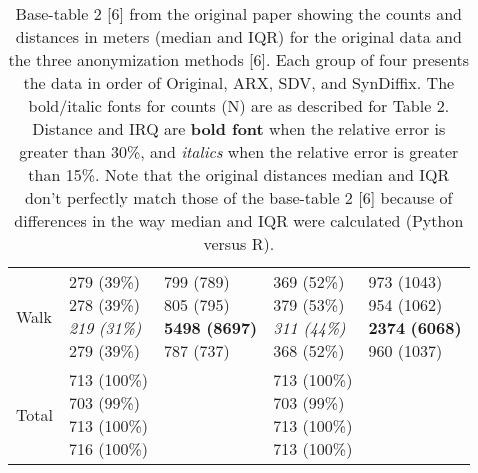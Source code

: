\documentclass[10pt]{article}
\newcommand{\mycite}[1]{[#1]}
\begin{document}
\begin{table}
\begin{center}
\begin{small}
\begin{tabular}{lllll}
Walk      &  \makecell[l]{\textnormal{279} \textnormal{(39\%)} \\\textnormal{278} \textnormal{(39\%)} \\\textit{219} \textit{(31\%)} \\\textnormal{279} \textnormal{(39\%)} \\}      &  \makecell[l]{\textnormal{799} \textnormal{(789)} \\\textnormal{805} \textnormal{(795)} \\\textbf{5498} \textbf{(8697)} \\\textnormal{787} \textnormal{(737)} \\}      &  \makecell[l]{\textnormal{369} \textnormal{(52\%)} \\\textnormal{379} \textnormal{(53\%)} \\\textit{311} \textit{(44\%)} \\\textnormal{368} \textnormal{(52\%)} \\}      &  \makecell[l]{\textnormal{973} \textnormal{(1043)} \\\textnormal{954} \textnormal{(1062)} \\\textbf{2374} \textbf{(6068)} \\\textnormal{960} \textnormal{(1037)} \\} \\ \cline{2-5}
      Total       & \makecell[l]{713 (100\%) \\703 (99\%) \\713 (100\%) \\716 (100\%) \\} &       & \makecell[l]{713 (100\%) \\703 (99\%) \\713 (100\%) \\713 (100\%) \\} & \\ 

      \bottomrule
      \end{tabular}
      \end{small}
      \caption{Base-table 2 \mycite{6} from the original paper showing the counts and distances in meters (median and IQR) for the original data and the three anonymization methods \mycite{6}. Each group of four presents the data in order of Original, ARX, SDV, and SynDiffix. The bold/italic fonts for counts (N) are as described for Table 2. Distance and IRQ are \textbf{bold font} when the relative error is greater than 30\%, and \textit{italics} when the relative error is greater than 15\%.  Note that the original distances median and IQR don't perfectly match those of the base-table 2 \mycite{6} because of differences in the way median and IQR were calculated (Python versus R).}
      \label{tab:table2}
      \end{center}
      \end{table}
      \setlength{\fboxsep}{3pt}
    
\end{document}
